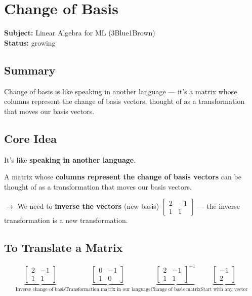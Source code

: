 \section{Change of Basis}
\label{sec:change-of-basis}

\noindent\textbf{Subject:} Linear Algebra for ML (3Blue1Brown) \\
\textbf{Status:} growing

\subsection*{Summary}
Change of basis is like speaking in another language --- it's a matrix whose columns represent the change of basis vectors, thought of as a transformation that moves our basis vectors.

\subsection{Core Idea}

\begin{defbox}
It's like \textbf{speaking in another language}.
\end{defbox}

A matrix whose \textbf{columns represent the change of basis vectors} can be thought of as a transformation that moves our basis vectors.

$\rightarrow$ We need to \textbf{inverse the vectors} (new basis) $\begin{bmatrix} 2 & -1 \\ 1 & 1 \end{bmatrix}$ --- the inverse transformation is a new transformation.

\subsection{To Translate a Matrix}

\[
\underbrace{\begin{bmatrix} 2 & -1 \\ 1 & 1 \end{bmatrix}}_{\text{Inverse change of basis}}
\underbrace{\begin{bmatrix} 0 & -1 \\ 1 & 0 \end{bmatrix}}_{\text{Transformation matrix in our language}}
\underbrace{\begin{bmatrix} 2 & -1 \\ 1 & 1 \end{bmatrix}^{-1}}_{\text{Change of basis matrix}}
\underbrace{\begin{bmatrix} -1 \\ 2 \end{bmatrix}}_{\text{Start with any vector}}
\]

